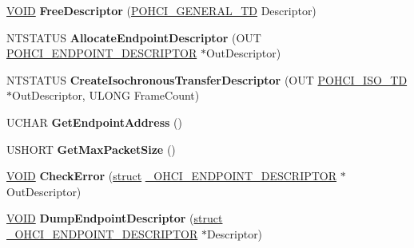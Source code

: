 \begin{DoxyCompactItemize}
\mbox{\label{class_c_u_s_b_request_a3cfbebae9b90a63a2bfe599fa7415bcd}} 
\hyperlink{interfacevoid}{V\+O\+ID} {\bfseries Free\+Descriptor} (\hyperlink{struct_o_h_c_i___g_e_n_e_r_a_l___t_d}{P\+O\+H\+C\+I\+\_\+\+G\+E\+N\+E\+R\+A\+L\+\_\+\+TD} Descriptor)
\item 
\mbox{\label{class_c_u_s_b_request_a4e86f3e2dfe4b75988275786ad98d1ee}} 
N\+T\+S\+T\+A\+T\+US {\bfseries Allocate\+Endpoint\+Descriptor} (O\+UT \hyperlink{struct___o_h_c_i___e_n_d_p_o_i_n_t___d_e_s_c_r_i_p_t_o_r}{P\+O\+H\+C\+I\+\_\+\+E\+N\+D\+P\+O\+I\+N\+T\+\_\+\+D\+E\+S\+C\+R\+I\+P\+T\+OR} $\ast$Out\+Descriptor)
\item 
\mbox{\label{class_c_u_s_b_request_a42611c06f68dff9a06982d05d080fab1}} 
N\+T\+S\+T\+A\+T\+US {\bfseries Create\+Isochronous\+Transfer\+Descriptor} (O\+UT \hyperlink{struct___o_h_c_i___i_s_o___t_d__}{P\+O\+H\+C\+I\+\_\+\+I\+S\+O\+\_\+\+TD} $\ast$Out\+Descriptor, U\+L\+O\+NG Frame\+Count)
\item 
\mbox{\label{class_c_u_s_b_request_aa3ece5c8123ef906c134eeb3ada68c25}} 
U\+C\+H\+AR {\bfseries Get\+Endpoint\+Address} ()
\item 
\mbox{\label{class_c_u_s_b_request_ac79908e17dcded7104b9c2d4cc77d38d}} 
U\+S\+H\+O\+RT {\bfseries Get\+Max\+Packet\+Size} ()
\item 
\mbox{\label{class_c_u_s_b_request_aa7cae56ab871816da38dc3e71fb2a4b9}} 
\hyperlink{interfacevoid}{V\+O\+ID} {\bfseries Check\+Error} (\hyperlink{interfacestruct}{struct} \hyperlink{struct___o_h_c_i___e_n_d_p_o_i_n_t___d_e_s_c_r_i_p_t_o_r}{\+\_\+\+O\+H\+C\+I\+\_\+\+E\+N\+D\+P\+O\+I\+N\+T\+\_\+\+D\+E\+S\+C\+R\+I\+P\+T\+OR} $\ast$Out\+Descriptor)
\item 
\mbox{\label{class_c_u_s_b_request_aefc32a671e9f6e27bc0212f1530b175b}} 
\hyperlink{interfacevoid}{V\+O\+ID} {\bfseries Dump\+Endpoint\+Descriptor} (\hyperlink{interfacestruct}{struct} \hyperlink{struct___o_h_c_i___e_n_d_p_o_i_n_t___d_e_s_c_r_i_p_t_o_r}{\+\_\+\+O\+H\+C\+I\+\_\+\+E\+N\+D\+P\+O\+I\+N\+T\+\_\+\+D\+E\+S\+C\+R\+I\+P\+T\+OR} $\ast$Descriptor)
\item 

\end{DoxyCompactItemize}
